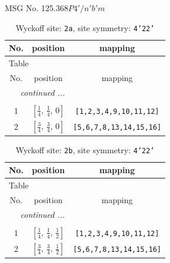 \documentclass[fleqn,8pt]{jsarticle}
\begin{document}
\setcounter{MaxMatrixCols}{32}

\renewcommand{\tablename}{Table~}
\renewcommand{\figurename}{Figure~}
\begin{center}
\LARGE
MSG No. 125.368\quad$P4'/n'b'm$
\end{center}
\renewcommand{\arraystretch}{1.2}
\begin{longtable}{ccc}
\caption{Wyckoff site: {\tt 2a}, site symmetry: {\tt 4'22'}}
 \\
 \hline \hline
No. & position & mapping \\ \hline \endfirsthead

\multicolumn{2}{l}{\tablename\ \thetable{}} \\
 \hline \hline
No. & position & mapping \\ \hline \endhead

 \hline \hline
\multicolumn{2}{r}{\footnotesize\it continued ...} \\ \endfoot

 \hline \hline
\multicolumn{2}{r}{} \\ \endlastfoot

1 & $\left[ \frac{1}{4},\, \frac{1}{4},\, 0 \right]$ & {\tt [1,2,3,4,9,10,11,12]} \\ \hline
2 & $\left[ \frac{3}{4},\, \frac{3}{4},\, 0 \right]$ & {\tt [5,6,7,8,13,14,15,16]} \\
\end{longtable}
\renewcommand{\arraystretch}{1.2}
\begin{longtable}{ccc}
\caption{Wyckoff site: {\tt 2b}, site symmetry: {\tt 4'22'}}
 \\
 \hline \hline
No. & position & mapping \\ \hline \endfirsthead

\multicolumn{2}{l}{\tablename\ \thetable{}} \\
 \hline \hline
No. & position & mapping \\ \hline \endhead

 \hline \hline
\multicolumn{2}{r}{\footnotesize\it continued ...} \\ \endfoot

 \hline \hline
\multicolumn{2}{r}{} \\ \endlastfoot

1 & $\left[ \frac{1}{4},\, \frac{1}{4},\, \frac{1}{2} \right]$ & {\tt [1,2,3,4,9,10,11,12]} \\ \hline
2 & $\left[ \frac{3}{4},\, \frac{3}{4},\, \frac{1}{2} \right]$ & {\tt [5,6,7,8,13,14,15,16]} \\
\end{longtable}
\end{document}

